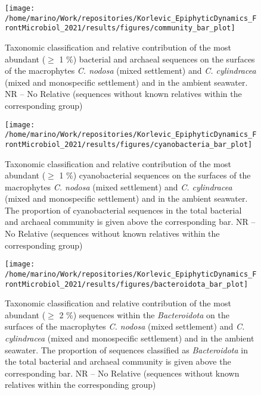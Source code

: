 \documentclass[
  12pt,
]{article}
\begin{document}
\begin{figure}[H]

{\centering \texttt{[image: /home/marino/Work/repositories/Korlevic\_EpiphyticDynamics\_FrontMicrobiol\_2021/results/figures/community\_bar\_plot]} 

}

\caption{Taxonomic classification and relative contribution of the most abundant ($\geq$ 1 \si{\percent}) bacterial and archaeal sequences on the surfaces of the macrophytes \textit{C. nodosa} (mixed settlement) and \textit{C. cylindracea} (mixed and monospecific settlement) and in the ambient seawater. NR -- No Relative (sequences without known relatives within the corresponding group)\label{community}}\label{fig:unnamed-chunk-4}
\end{figure}

\begin{figure}[H]

{\centering \texttt{[image: /home/marino/Work/repositories/Korlevic\_EpiphyticDynamics\_FrontMicrobiol\_2021/results/figures/cyanobacteria\_bar\_plot]} 

}

\caption{Taxonomic classification and relative contribution of the most abundant ($\geq$ 1 \si{\percent}) cyanobacterial sequences on the surfaces of the macrophytes \textit{C. nodosa} (mixed settlement) and \textit{C. cylindracea} (mixed and monospecific settlement) and in the ambient seawater. The proportion of cyanobacterial sequences in the total bacterial and archaeal community is given above the corresponding bar. NR -- No Relative (sequences without known relatives within the corresponding group)\label{cyano}}\label{fig:unnamed-chunk-5}
\end{figure}

\begin{figure}[H]

{\centering \texttt{[image: /home/marino/Work/repositories/Korlevic\_EpiphyticDynamics\_FrontMicrobiol\_2021/results/figures/bacteroidota\_bar\_plot]} 

}

\caption{Taxonomic classification and relative contribution of the most abundant ($\geq$ 2 \si{\percent}) sequences within the \textit{Bacteroidota} on the surfaces of the macrophytes \textit{C. nodosa} (mixed settlement) and \textit{C. cylindracea} (mixed and monospecific settlement) and in the ambient seawater. The proportion of sequences classified as \textit{Bacteroidota} in the total bacterial and archaeal community is given above the corresponding bar. NR -- No Relative (sequences without known relatives within the corresponding group)\label{bactero}}\label{fig:unnamed-chunk-6}
\end{figure}
\end{document}
